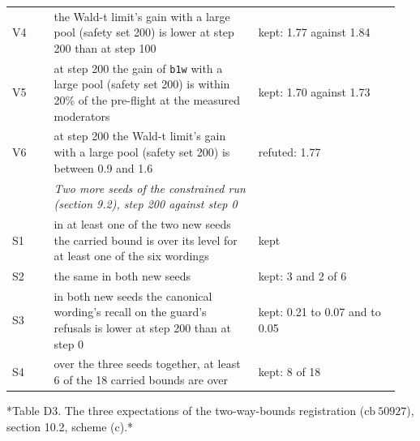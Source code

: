 \documentclass[11pt]{article}
\begin{document}
\begin{longtable}{@{}>{\raggedright\arraybackslash}p{0.101\linewidth}>{\raggedright\arraybackslash}p{0.499\linewidth}>{\raggedright\arraybackslash}p{0.346\linewidth}@{}}
\hspace{0pt}V4 & \hspace{0pt}the Wald-t limit's gain with a large pool (safety set 200) is lower at step 200 than at step 100 & \hspace{0pt}kept: 1.77 against 1.84 \\
\hspace{0pt}V5 & \hspace{0pt}at step 200 the gain of \texttt{b1w} with a large pool (safety set 200) is within 20\% of the pre-flight at the measured moderators & \hspace{0pt}kept: 1.70 against 1.73 \\
\hspace{0pt}V6 & \hspace{0pt}at step 200 the Wald-t limit's gain with a large pool (safety set 200) is between 0.9 and 1.6 & \hspace{0pt}refuted: 1.77 \\
 & \hspace{0pt}\emph{Two more seeds of the constrained run (section 9.2), step 200 against step 0} &  \\
\hspace{0pt}S1 & \hspace{0pt}in at least one of the two new seeds the carried bound is over its level for at least one of the six wordings & \hspace{0pt}kept \\
\hspace{0pt}S2 & \hspace{0pt}the same in both new seeds & \hspace{0pt}kept: 3 and 2 of 6 \\
\hspace{0pt}S3 & \hspace{0pt}in both new seeds the canonical wording's recall on the guard's refusals is lower at step 200 than at step 0 & \hspace{0pt}kept: 0.21 to 0.07 and to 0.05 \\
\hspace{0pt}S4 & \hspace{0pt}over the three seeds together, at least 6 of the 18 carried bounds are over & \hspace{0pt}kept: 8 of 18 \\
\end{longtable}
\endgroup

*Table D3. The three expectations of the two-way-bounds registration ($\text{cb}\ 50927$), section 10.2, scheme (c).*
\end{document}
